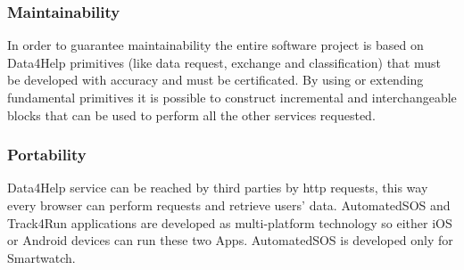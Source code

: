 \subsubsection{Maintainability}
In order to guarantee maintainability the entire software project is based on Data4Help primitives (like data request, exchange and classification) that must be developed with accuracy and must be certificated. By using or extending fundamental primitives it is possible to construct incremental and interchangeable blocks that can be used to perform all the other services requested.
\subsubsection{Portability}
Data4Help service can be reached by third parties by http requests, this way every browser can perform requests and retrieve users' data.
AutomatedSOS and Track4Run applications are developed as multi-platform technology so either iOS or Android devices can run these two Apps. AutomatedSOS is developed only for Smartwatch.


